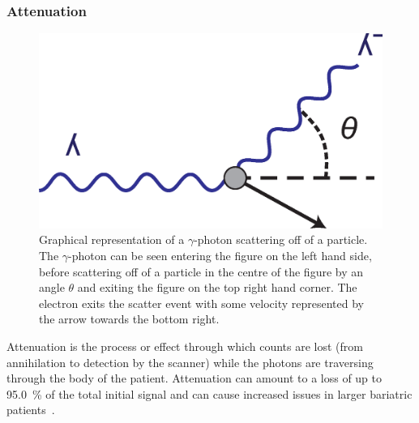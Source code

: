             \subsubsection{Attenuation} \label{sec:attenuation}
                \begin{figure}
                    \centering
                    
                    \includegraphics[width=1.0\linewidth]{figures/background_scatter.png}
                    
                    \captionsetup{singlelinecheck=false}
                    \caption{
                        Graphical representation of a $\gamma$-photon scattering off of a particle. The $\gamma$-photon can be seen entering the figure on the left hand side, before scattering off of a particle in the centre of the figure by an angle $\theta$ and exiting the figure on the top right hand corner. The electron exits the scatter event with some velocity represented by the arrow towards the bottom right. 
                    }
                    \label{fig:attenuation_scatter}
                \end{figure}
                
                Attenuation is the process or effect through which counts are lost (from annihilation to detection by the scanner) while the photons are traversing through the body of the patient. Attenuation can amount to a loss of up to \SI{95.0}{\percent} of the total initial signal and can cause increased issues in larger bariatric patients~\parencite{petspringer, Essential2012}. %
                
